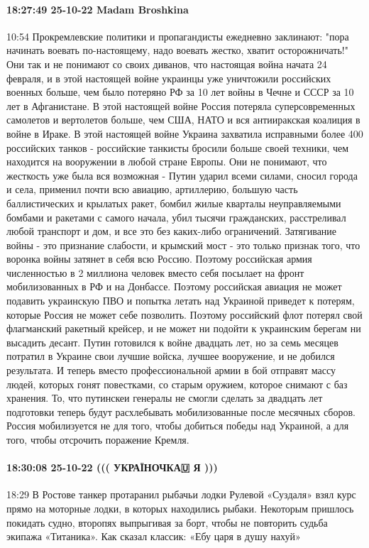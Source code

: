 \paragraph{18:27:49 25-10-22 Madam Broshkina}
10:54
Прокремлевские политики и пропагандисты ежедневно заклинают: "пора начинать воевать по-настоящему, надо воевать жестко, хватит осторожничать!"
Они так и не понимают со своих диванов, что настоящая война начата 24 февраля, и в этой настоящей войне украинцы уже уничтожили российских военных больше, чем было потеряно РФ за 10 лет войны в Чечне и СССР за 10 лет в Афганистане.
В этой настоящей войне Россия потеряла суперсовременных самолетов и вертолетов больше, чем США, НАТО и вся антииракская коалиция в войне в Ираке.
В этой настоящей войне Украина захватила исправными более 400 российских танков - российские танкисты бросили больше своей техники, чем находится на вооружении в любой стране Европы.
Они не понимают, что жесткость уже была вся возможная - Путин ударил всеми силами, сносил города и села, применил почти всю авиацию, артиллерию, большую часть баллистических и крылатых ракет, бомбил жилые кварталы неуправляемыми бомбами и ракетами с самого начала, убил тысячи гражданских, расстреливал любой транспорт и дом, и все это без каких-либо ограничений.
Затягивание войны - это признание слабости, и крымский мост - это только признак того, что воронка войны затянет в себя всю Россию.
Поэтому российская армия численностью в 2 миллиона человек вместо себя посылает на фронт мобилизованных в РФ и на Донбассе.
Поэтому российская авиация не может подавить украинскую ПВО и попытка летать над Украиной приведет к потерям, которые Россия не может себе позволить.
Поэтому российский флот потерял свой флагманский ракетный крейсер, и не может ни подойти к украинским берегам ни высадить десант.
Путин готовился к войне двадцать лет, но за семь месяцев потратил в Украине свои лучшие войска, лучшее вооружение, и не добился результата. И теперь вместо профессиональной армии в бой отправят массу людей, которых гонят повестками, со старым оружием, которое снимают с баз хранения. То, что путинскеи генералы не смогли сделать за двадцать лет подготовки теперь будут расхлебывать мобилизованные после месячных сборов. Россия мобилизуется не для того, чтобы добиться победы над Украиной, а для того, чтобы отсрочить поражение Кремля.

\paragraph{18:30:08 25-10-22 ((( УКРАЇНОЧКА🇺 Я )))}
18:29
В Ростове танкер протаранил рыбачьи лодки
Рулевой «Суздаля» взял курс прямо на моторные лодки, в которых находились рыбаки. Некоторым пришлось покидать судно, второпях выпрыгивая за борт, чтобы не повторить судьба экипажа «Титаника».
Как сказал классик: «Ебу царя в душу нахуй»

